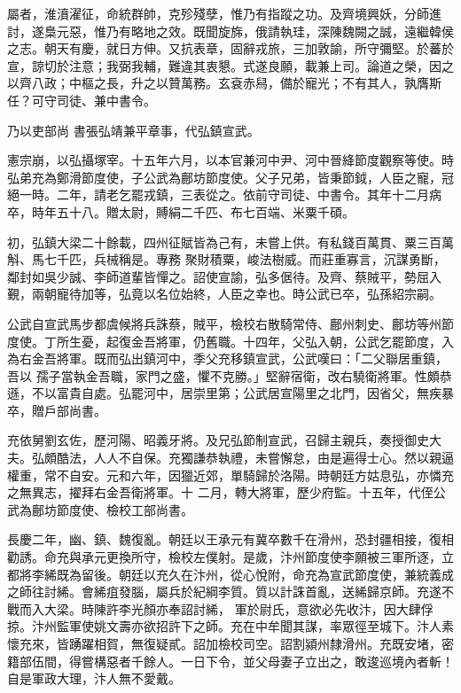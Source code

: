 \begin{pinyinscope}
 屬者，淮濆濯征，命統群帥，克殄殘孽，惟乃有指蹤之功。及齊境興妖，分師進討，遂梟元惡，惟乃有略地之效。既聞旋旆，俄請執珪，深陳魏闕之誠，遠繼韓侯之志。朝天有慶，就日方伸。又抗表章，固辭戎旅，三加敦諭，所守彌堅。於蕃於宣，諒切於注意；我弼我輔，難違其衷懇。式遂良願，載兼上司。論道之榮，因之以齊八政；中樞之長，升之以贊萬務。玄袞赤舄，備於寵光；不有其人，孰膺斯任？可守司徒、兼中書令。



 乃以吏部尚
 書張弘靖兼平章事，代弘鎮宣武。



 憲宗崩，以弘攝塚宰。十五年六月，以本官兼河中尹、河中晉絳節度觀察等使。時弘弟充為鄭滑節度使，子公武為鄜坊節度使。父子兄弟，皆秉節鉞，人臣之寵，冠絕一時。二年，請老乞罷戎鎮，三表從之。依前守司徒、中書令。其年十二月病卒，時年五十八。贈太尉，賻絹二千匹、布七百端、米粟千碩。



 初，弘鎮大梁二十餘載，四州征賦皆為己有，未嘗上供。有私錢百萬貫、粟三百萬斛、馬七千匹，兵械稱是。專務
 聚財積粟，峻法樹威。而莊重寡言，沉謀勇斷，鄰封如吳少誠、李師道輩皆憚之。詔使宣諭，弘多倨待。及齊、蔡賊平，勢屈入覲，兩朝寵待加等，弘竟以名位始終，人臣之幸也。時公武已卒，弘孫紹宗嗣。



 公武自宣武馬步都虞候將兵誅蔡，賊平，檢校右散騎常侍、鄜州刺史、鄜坊等州節度使。丁所生憂，起復金吾將軍，仍舊職。十四年，父弘入朝，公武乞罷節度，入為右金吾將軍。既而弘出鎮河中，季父充移鎮宣武，公武嘆曰：「二父聯居重鎮，吾以
 孺子當執金吾職，家門之盛，懼不克勝。」堅辭宿衛，改右驍衛將軍。性頗恭遜，不以富貴自處。弘罷河中，居崇里第；公武居宣陽里之北門，因省父，無疾暴卒，贈戶部尚書。



 充依舅劉玄佐，歷河陽、昭義牙將。及兄弘節制宣武，召歸主親兵，奏授御史大夫。弘頗酷法，人人不自保。充獨謙恭執禮，未嘗懈怠，由是遍得士心。然以親逼權重，常不自安。元和六年，因獵近郊，單騎歸於洛陽。時朝廷方姑息弘，亦憐充之無異志，擢拜右金吾衛將軍。十
 二月，轉大將軍，歷少府監。十五年，代侄公武為鄜坊節度使、檢校工部尚書。



 長慶二年，幽、鎮、魏復亂。朝廷以王承元有冀卒數千在滑州，恐封疆相接，復相勸誘。命充與承元更換所守，檢校左僕射。是歲，汴州節度使李願被三軍所逐，立都將李絺既為留後。朝廷以充久在汴州，從心悅附，命充為宣武節度使，兼統義成之師往討絺。會絺疽發腦，屬兵於紀綱李質。質以計誅首亂，送絺歸京師。充遂不戰而入大梁。時陳許李光顏亦奉詔討絺，
 軍於尉氏，意欲必先收汴，因大肆俘掠。汴州監軍使姚文壽亦欲招許下之師。充在中牟聞其謀，率眾徑至城下。汴人素懷充來，皆踴躍相賀，無復疑貳。詔加檢校司空。詔割潁州隸滑州。充既安堵，密籍部伍間，得嘗構惡者千餘人。一日下令，並父母妻子立出之，敢逡巡境內者斬！自是軍政大理，汴人無不愛戴。




\end{pinyinscope}
